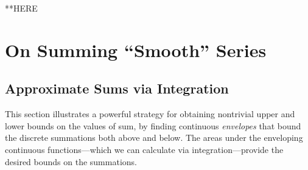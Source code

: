 **HERE

\section{On Summing ``Smooth'' Series}
\label{sec:smooth-series}

\subsection{Approximate Sums via Integration}
\label{sec:riemann-bounds}

This section illustrates a powerful strategy for obtaining nontrivial
upper and lower bounds on the values of sum, by finding continuous {\em
  envelopes} that bound the discrete summations both above and below.
The areas under the enveloping continuous functions---which we can
calculate via integration---provide the desired bounds on the
summations.

